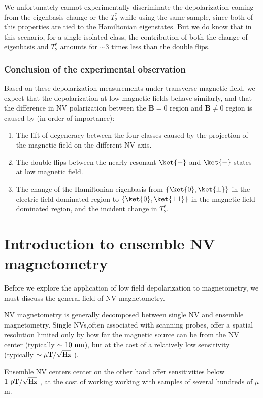 \documentclass[a4paper,11pt]{report}
\begin{document}
We unfortunately cannot experimentally discriminate the depolarization coming from the eigenbasis change or the $T_2^*$ while using the same sample, since both of this properties are tied to the Hamiltonian eigenstates. But we do know that in this scenario, for a single isolated class, the contribution of both the change of eigenbasis and $T_2^*$ amounts for $\sim 3$ times less than the double flips. 

\subsubsection{Conclusion of the experimental observation}

Based on these depolarization measurements under transverse magnetic field, we expect that the depolarization at low magnetic fields behave similarly, and that the difference in NV polarization between the $\mathbf{B}=0$ region and $\mathbf{B} \neq 0$ region is caused by (in order of importance):
\begin{enumerate}
\item The lift of degeneracy between the four classes caused by the projection of the magnetic field on the different NV axis.
\item The double flips between the nearly resonant $\ket{+}$ and $\ket{-}$ states at low magnetic field.
\item The change of the Hamiltonian eigenbasis from $\{\ket{0}, \ket{\pm} \}$ in the electric field dominated region to $\{\ket{0}, \ket{\pm 1} \}$ in the magnetic field dominated region, and the incident change in $T_2^*$.
\end{enumerate}

\section{Introduction to ensemble NV magnetometry}
Before we explore the application of low field depolarization to magnetometry, we must discuss the general field of NV magnetometry. 

NV magnetometry is generally decomposed between single NV and ensemble magnetometry. Single NVs,often associated with scanning probes, offer a spatial resolution limited only by how far the magnetic source can be from the NV center (typically $\sim 10\ \rm nm$), but at the cost of a relatively low sensitivity (typically $\sim \mu \rm{T} / \sqrt{\rm Hz}$ \citep{pelliccione2016scanned}).

Ensemble NV centers center on the other hand offer sensitivities below $1\ \rm pT / \sqrt{\rm Hz}$ \citep{wolf2015subpicotesla}, at the cost of working working with samples of several hundreds of $\mu$m.
\end{document}
